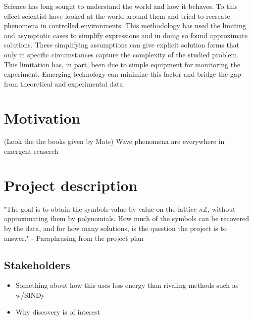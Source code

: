

Science has long sought to understand the world and how it behaves.
To this effect scientist have looked at the world around them and tried to recreate phenomena in controlled environments.
This methodology has used the limiting and asymptotic cases to simplify expressions and in doing so found approximate solutions.
These simplifying assumptions can give explicit solution forms that only in specific circumstances capture the complexity of the studied problem.
This limitation has, in part, been due to simple equipment for monitoring the experiment.
Emerging technology can minimize this factor and bridge the gap from theoretical and experimental data. 

\section{Motivation}
(Look the the books given by Mats)
Wave phenomena are everywhere in emergent reaserch


\section{Project description}
"The goal is to obtain the symbols value by value on the lattice $\kappa \mathbb{Z}$, without approximating them by polynomials.
How much of the symbols can be recovered by the data, and for how many solutions, is the question the project is to answer." 
- Paraphrasing from the project plan


\subsection{Stakeholders}
\begin{itemize}
    \item Something about how this uses less energy than rivaling methods such as w/SINDy
    \item Why discovery is of interest
\end{itemize}



